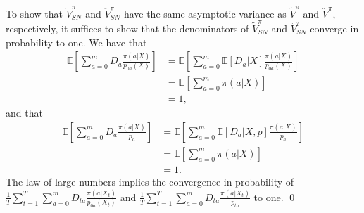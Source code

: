 \documentclass[letterpaper]{article} \usepackage{aaai19}  \usepackage{times}  \usepackage{helvet}  \usepackage{courier}  \usepackage{url}  \usepackage{graphicx}  \frenchspacing  \usepackage{comment}
\begin{document}
To show that $\tilde V^\pi_{SN}$ and $\ddot V^\pi_{SN}$ have the same asymptotic variance as $\tilde V^\pi$ and $\ddot V^\pi$, respectively, it suffices to show that the denominators of $\tilde V^\pi_{SN}$ and $\ddot V^\pi_{SN}$ converge in probability to one.
We have that
\begin{align*}
	\mathbb{E}[\sum_{a=0}^mD_a\frac{\pi(a|X)}{p_{0a}(X)}]&=\mathbb{E}[\sum_{a=0}^m\mathbb{E}[D_a|X]\frac{\pi(a|X)}{p_{0a}(X)}]\\
	&=\mathbb{E}[\sum_{a=0}^m\pi(a|X)]\\
	&=1,
\end{align*}
and that
\begin{align*}
	\mathbb{E}[\sum_{a=0}^mD_a\frac{\pi(a|X)}{p_a}]&=\mathbb{E}[\sum_{a=0}^m\mathbb{E}[D_a|X,p]\frac{\pi(a|X)}{p_a}]\\
	&=\mathbb{E}[\sum_{a=0}^m\pi(a|X)]\\
	&=1.
\end{align*}
The law of large numbers implies the convergence in probability of $\frac{1}{T}\sum_{t=1}^T\sum_{a=0}^m D_{ta}\frac{\pi(a|X_t)}{p_{0a}(X_t)}$ and $\frac{1}{T}\sum_{t=1}^T\sum_{a=0}^m D_{ta}\frac{\pi(a|X_t)}{p_{ta}}$ to one.
\qed
\end{document}
